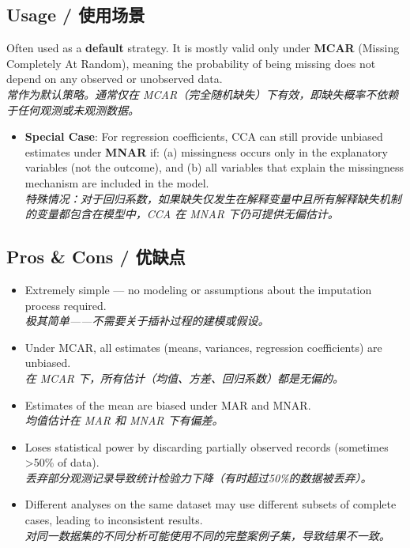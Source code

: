 \documentclass[9pt, a4paper]{article}
\begin{document}
\subsection{Usage / 使用场景}
Often used as a \textbf{default} strategy. It is mostly valid only under \textbf{MCAR} (Missing Completely At Random), meaning the probability of being missing does not depend on any observed or unobserved data.\\
\textit{常作为默认策略。通常仅在 MCAR（完全随机缺失）下有效，即缺失概率不依赖于任何观测或未观测数据。}
\begin{itemize}
    \item \textbf{Special Case}: For regression coefficients, CCA can still provide unbiased estimates under \textbf{MNAR} if: (a) missingness occurs only in the explanatory variables (not the outcome), and (b) all variables that explain the missingness mechanism are included in the model.\\
    \textit{特殊情况：对于回归系数，如果缺失仅发生在解释变量中且所有解释缺失机制的变量都包含在模型中，CCA 在 MNAR 下仍可提供无偏估计。}
\end{itemize}

\subsection{Pros \& Cons / 优缺点}
\begin{tcolorbox}[prosbox]
    \begin{itemize}
        \item [\ding{51}] Extremely simple — no modeling or assumptions about the imputation process required.\\
        \textit{极其简单——不需要关于插补过程的建模或假设。}
        \item [\ding{51}] Under MCAR, all estimates (means, variances, regression coefficients) are unbiased.\\
        \textit{在 MCAR 下，所有估计（均值、方差、回归系数）都是无偏的。}
    \end{itemize}
\end{tcolorbox}
\begin{tcolorbox}[consbox]
    \begin{itemize}
        \item [\ding{55}] Estimates of the mean are biased under MAR and MNAR.\\
        \textit{均值估计在 MAR 和 MNAR 下有偏差。}
        \item [\ding{55}] Loses statistical power by discarding partially observed records (sometimes >50\% of data).\\
        \textit{丢弃部分观测记录导致统计检验力下降（有时超过50\%的数据被丢弃）。}
        \item [\ding{55}] Different analyses on the same dataset may use different subsets of complete cases, leading to inconsistent results.\\
        \textit{对同一数据集的不同分析可能使用不同的完整案例子集，导致结果不一致。}
    \end{itemize}
\end{tcolorbox}
\end{document}
